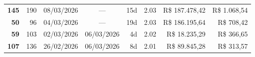 \documentclass[a4paper,10pt]{article}
\begin{document}
\begin{center}
\begin{longtable}{>{\scriptsize}r>{\scriptsize}r>{\scriptsize}c>{\scriptsize}c>{\scriptsize}r>{\scriptsize}r>{\scriptsize}r>{\scriptsize}r}
\textcolor{anomyellow}{\textbf{145}} & 190 & 08/03/2026 & — & 15d & \textcolor{anomyellow}{2.03} & R\$ 187.478,42 & \textcolor{anomred}{R\$ 1.068,54} \\

\textcolor{anomyellow}{\textbf{50}} & 96 & 04/03/2026 & — & 19d & \textcolor{anomyellow}{2.03} & R\$ 186.195,64 & \textcolor{anomred}{R\$ 708,42} \\

\textcolor{anomyellow}{\textbf{59}} & 103 & 02/03/2026 & 06/03/2026 & 4d & \textcolor{anomyellow}{2.02} & R\$ 18.235,29 & \textcolor{anomred}{R\$ 366,65} \\

\textcolor{anomyellow}{\textbf{107}} & 136 & 26/02/2026 & 06/03/2026 & 8d & \textcolor{anomyellow}{2.01} & R\$ 89.845,28 & \textcolor{anomred}{R\$ 313,57} \\

\end{longtable}\end{center}
\end{document}
